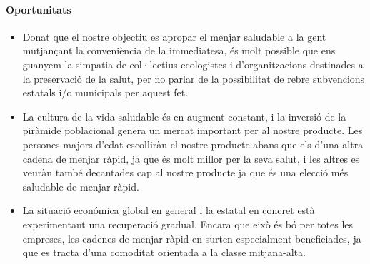 \paragraph{Oportunitats}
\begin{itemize}
  \item Donat que el nostre objectiu es apropar el menjar saludable a la gent mutjançant la conveniència de la immediatesa, és molt possible que ens guanyem la simpatia de col·lectius ecologistes i d'organitzacions destinades a la preservació de la salut, per no parlar de la possibilitat de rebre subvencions estatals i/o municipals per aquest fet.
  \item La cultura de la vida saludable és en augment constant, i la inversió de la piràmide poblacional genera un mercat important per al nostre producte. Les persones majors d'edat escolliràn el nostre producte abans que els d'una altra cadena de menjar ràpid, ja que és molt millor per la seva salut, i les altres es veuràn també decantades cap al nostre producte ja que és una elecció més saludable de menjar ràpid.
  \item La situació económica global en general i la estatal en concret està experimentant una recuperació gradual. Encara que eixò és bó per totes les empreses, les cadenes de menjar ràpid en surten especialment beneficiades, ja que es tracta d'una comoditat orientada a la classe mitjana-alta\cite{poor_people_fast_food}.
\end{itemize}

